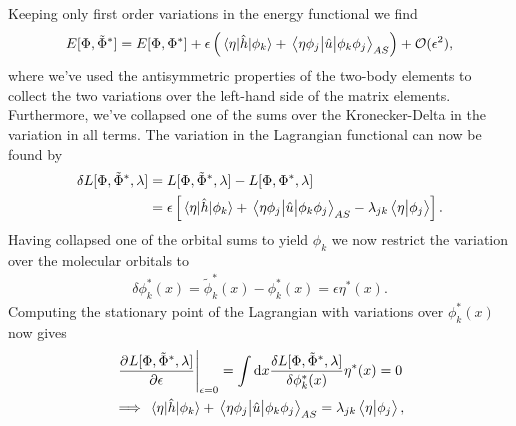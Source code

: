             Keeping only first order variations in the energy functional we find
            \begin{align}
                E[\Phi, \tilde{\Phi}^{*}]
                = E[\Phi, \Phi^{*}]
                + \epsilon\left( 
                    \mel{\eta}{\hat{h}}{\phi_k}
                    + \mel{\eta\phi_j}{\hat{u}}{\phi_k\phi_j}_{AS}
                 \right)
                + \mathcal{O}(\epsilon^2),
            \end{align}
            where we've used the antisymmetric properties of the two-body
            elements to collect the two variations over the left-hand side of
            the matrix elements.
            Furthermore, we've collapsed one of the sums over the
            Kronecker-Delta in the variation in all terms.
            The variation in the Lagrangian functional can now be found by
            \begin{align}
                \delta L[\Phi, \tilde{\Phi}^{*}, \lambda]
                &=
                L[\Phi, \tilde{\Phi}^{*}, \lambda]
                -
                L[\Phi, \Phi^{*}, \lambda]
                \\
                &=
                \epsilon\left[ 
                    \mel{\eta}{\hat{h}}{\phi_k}
                    +
                    \mel{\eta\phi_j}{\hat{u}}{\phi_k\phi_j}_{AS}
                    - \lambda_{jk}
                    \braket{\eta}{\phi_j}
                 \right].
            \end{align}
            Having collapsed one of the orbital sums to yield $\phi_k$ we now
            restrict the variation over the molecular orbitals to
            \begin{align}
                \delta\phi^{*}_k(x)
                = \tilde{\phi}^{*}_k(x)
                - \phi^{*}_k(x)
                = \epsilon\eta^{*}(x).
            \end{align}
            Computing the stationary point of the Lagrangian with variations
            over $\phi^{*}_k(x)$ now gives
            \begin{gather}
                \left.
                \dpd{
                    \lagrangianfunc{\slat, \tilde{\slat}^{*}, \lambda}
                }{\epsilon}
                \right\lvert_{\epsilon = 0}
                =
                \int\dd x\frac{
                    \delta\lagrangianfunc{\slat, \tilde{\slat}^{*}, \lambda}
                }{\delta \phi^{*}_k(x)}
                \eta^{*}(x)
                = 0
                \\
                \implies
                \mel{\eta}{\onehamil}{\phi_k}
                + \mel{\eta\phi_j}{\twohamil}{\phi_k\phi_j}_{AS}
                = \lambda_{jk}\braket{\eta}{\phi_j},
                \label{eq:stationary-lagrangian}
            \end{gather}
